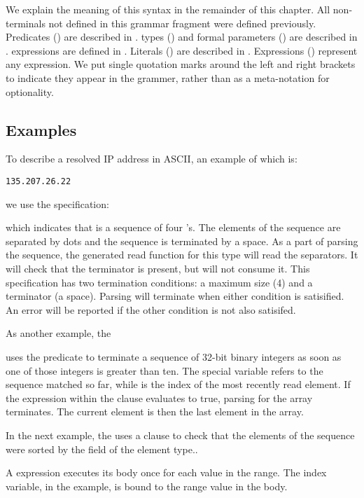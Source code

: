 \noindent
We explain the meaning of this syntax in the remainder of this chapter.
All non-terminals not defined in this grammar fragment were
defined previously.
Predicates () are described in .
\padsl{} types () and formal parameters ()
are described in .
\padsl{} expressions  are defined in .
Literals ()  are described in
.
Expressions () represent any \C{} expression.
We put single quotation marks around the left and right brackets to
indicate they appear in the grammer, rather than as a meta-notation
for optionality.

\subsection{Examples}
To describe a resolved IP address in ASCII, an example of which is:
\begin{center}
\begin{verbatim}
135.207.26.22
\end{verbatim}
\end{center}
we use the specification:

\noindent
which indicates that \Parray{}  is a sequence of
four 's.  The elements of the sequence are separated by
dots and the sequence is terminated by a space.  As a part of parsing
the sequence, the generated read function for this type will read the
separators.  It will check that the terminator is present, but will
not consume it.  This specification has two termination conditions: a
maximum size (4) and a terminator (a space).  Parsing will terminate
when either condition is satisified.  An error will be reported if the
other condition is not also satisifed.

As another example, the \Parray{} 

\noindent
uses the \Plast{} predicate to terminate a
sequence of 32-bit binary integers as soon as one of those integers is
greater than ten.  The special variable  refers to the
sequence matched so far, while  is the index of the most
recently read element.  If the expression within the \Plast{} clause
evaluates to true, parsing for the array terminates.  The current
element is then the last element in the array.

In the next example, the \Parray{}  uses a \Pwhere{}
clause to check that the elements of the sequence were sorted by the
 field of the element type..

A \Pforall{} expression executes its body once for each value in the
range. The index variable,  in the example, is bound to the
range value in the body.

